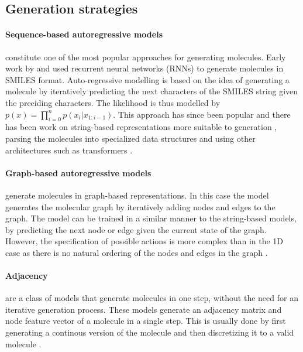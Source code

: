 \subsection{Generation strategies}
\paragraph{Sequence-based autoregressive models} constitute one of the most popular approaches for
generating molecules. Early work by \citep{seglerGeneratingFocusedMolecule2018} and
\citep{gomez-bombarelliAutomaticChemicalDesign2018} used recurrent neural networks (RNNs) to
generate molecules in SMILES format. Auto-regressive modelling is based on the idea of generating a
molecule by iteratively predicting the next characters of the SMILES string given the preciding
characters. The likelihood is thus modelled by $p(x) = \prod_{i=0}^n p(x_i | x_{1:i-1})$. This
approach has since been popular and there has been work on string-based representations more
suitable to generation
\citep{oboyleDeepSMILESAdaptationSMILES2018,krennSelfReferencingEmbeddedStrings2020}, parsing the
molecules into specialized data structures
\citep{kusnerGrammarVariationalAutoencoder2017,jinJunctionTreeVariational2018} and using other
architectures such as transformers \citep{vaswaniAttentionAllYou2017,noutahiGottaBeSAFE2023,schwallerMolecularTransformerModel2019,bagalMolGPTMolecularGeneration2022,mazuzMoleculeGenerationUsing2023}.

\paragraph{Graph-based autoregressive models} generate molecules in graph-based
representations. In this case the model generates the molecular graph by iteratively adding nodes
and edges to the graph. The model can be trained in a similar manner to the string-based models, by
predicting the next node or edge given the current state of the graph. However, the specification of
possible actions is more complex than in the 1D case as there is no natural ordering of the
nodes and edges in the graph \citep{cohen-karlikOvercomingOrderAutoregressive2024,youGraphConvolutionalPolicy2019}.

\paragraph{Adjacency} are a class of models that generate molecules in one step, without the
need for an iterative generation process. These models generate an adjacency matrix and node feature
vector of a molecule in a single step. This is usually done by first generating a continous version
of the molecule and then discretizing it to a valid molecule \citep{decaoMolGANImplicitGenerative2018,madhawaGraphNVPInvertibleFlow2019,kadurinCornucopiaMeaningfulLeads2016}.


